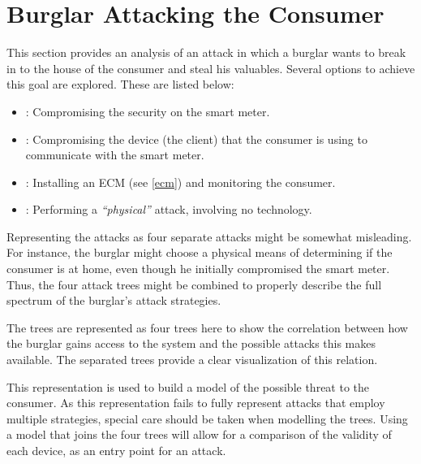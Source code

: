 \section{Burglar Attacking the Consumer}\label{attacktree:burglar}
This section provides an analysis of an attack in which a burglar wants to break in to the house of the consumer and steal his valuables.
Several options to achieve this goal are explored.
These are listed below:
\begin{itemize}
  \item {}: Compromising the security on the smart meter.
  \item {}: Compromising the device (the client) that the consumer is using to communicate with the smart meter.
  \item {}: Installing an ECM (see \cref{ecm}) and monitoring the consumer.
  \item {}: Performing a \emph{``physical''} attack, involving no technology.
\end{itemize}

Representing the attacks as four separate attacks might be somewhat misleading.
For instance, the burglar might choose a physical means of determining if the consumer is at home, even though he initially compromised the smart meter.
Thus, the four attack trees might be combined to properly describe the full spectrum of the burglar's attack strategies.

The trees are represented as four trees here to show the correlation between how the burglar gains access to the system and the possible attacks this makes available.
The separated trees provide a clear visualization of this relation.

This representation is used to build a model of the possible threat to the consumer.
As this representation fails to fully represent attacks that employ multiple strategies, special care should be taken when modelling the trees.
Using a model that joins the four trees will allow for a comparison of the validity of each device, as an entry point for an attack.




